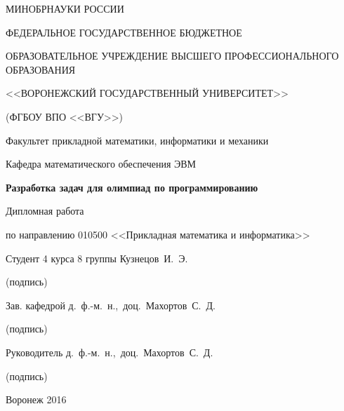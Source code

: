 \thispagestyle{empty}

{\large
\begin{center}
МИНОБРНАУКИ РОССИИ\par
ФЕДЕРАЛЬНОЕ ГОСУДАРСТВЕННОЕ БЮДЖЕТНОЕ\par
ОБРАЗОВАТЕЛЬНОЕ УЧРЕЖДЕНИЕ ВЫСШЕГО ПРОФЕССИОНАЛЬНОГО ОБРАЗОВАНИЯ\par
<<ВОРОНЕЖСКИЙ ГОСУДАРСТВЕННЫЙ УНИВЕРСИТЕТ>>\par
(ФГБОУ ВПО <<ВГУ>>)\par
\vspace{10mm}

Факультет прикладной математики, информатики и механики\par
\vspace{5mm}
Кафедра математического обеспечения ЭВМ\par
\vspace{22mm}

\textbf{Разработка задач для олимпиад по программированию}\par
\vspace{10mm}

Дипломная работа\par
\vspace{5mm}
по направлению 010500 <<Прикладная математика и информатика>>\par
\vspace{13mm}
\end{center}

Студент 4 курса 8 группы \underline{\qquad\qquad\qquad} Кузнецов~И.~Э.\par
\qquad\qquad\qquad\qquad\qquad\qquad\quad(подпись)\par
\vspace{2mm}
Зав. кафедрой \underline{\qquad\qquad\qquad} д.~ф.-м.~н.,~доц.~Махортов~С.~Д.\par
\qquad\qquad\qquad\qquad(подпись)\par
\vspace{2mm}
Руководитель \underline{\qquad\qquad\qquad} д.~ф.-м.~н.,~доц.~Махортов~С.~Д.\par
\qquad\qquad\qquad\qquad(подпись)\par
\vspace{23mm}

\begin{center}
Воронеж 2016
\end{center}}